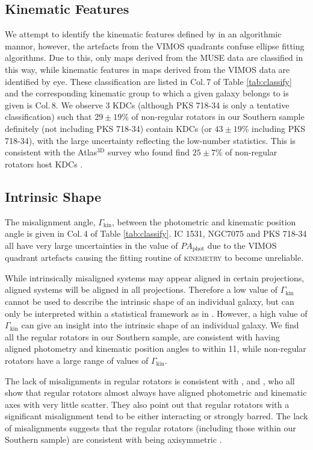 \documentclass[a4paper,fleqn,usenatbib]{mnras}
\begin{document}
	\subsection{Kinematic Features}
		We attempt to identify the kinematic features defined by \citet{Krajnovic2011} in an algorithmic mannor, however, the artefacts from the VIMOS quadrants confuse ellipse fitting algorithms. Due to this, only maps derived from the MUSE data are classified in this way, while kinematic features in maps derived from the VIMOS data are identified by eye. These classification are listed in Col.\,7 of Table \ref{tab:classify} and the corresponding kinematic group \citep[also defined by][]{Krajnovic2011} to which a given galaxy belongs to is given is Col.\,8. We observe 3 KDCs (although PKS 718-34 is only a tentative classification) such that $29\pm19$\% of non-regular rotators in our Southern sample definitely (not including PKS 718-34) contain KDCs (or $43\pm19$\% including PKS 718-34), with the large uncertainty reflecting the low-number statistics. This is consistent with the Atlas$^\text{3D}$ survey who found find $25\pm7$\% of non-regular rotators host KDCs \citep{Krajnovic2011}.


	\subsection{Intrinsic Shape}
		The misalignment angle, $\Gamma_\text{kin}$, between the photometric and kinematic position angle is given in Col.\,4 of Table \ref{tab:classify}. IC 1531, NGC7075 and PKS 718-34 all have very large uncertainties in the value of $PA_\text{phot}$ due to the VIMOS quadrant artefacts causing the fitting routine of \textsc{kinemetry} to become unreliable.

		While intrinsically misaligned systems may appear aligned in certain projections, aligned systems will be aligned in all projections. Therefore a low value of $\Gamma_\text{kin}$ cannot be used to describe the intrinsic shape of an individual galaxy, but can only be interpreted within a statistical framework as in \citet{Cappellari2007}. However, a high value of $\Gamma_\text{kin}$ can give an insight into the intrinsic shape of an individual galaxy. We find all the regular rotators in our Southern sample, are consistent with having aligned photometry and kinematic position angles to within 11\degr, while non-regular rotators have a large range of values of $\Gamma_\text{kin}$.  

		The lack of misalignments in regular rotators is consistent with \citet{Cappellari2007}, \citet{Krajnovic2011} and \citet{Fogarty2015}, who all show that regular rotators almost always have aligned photometric and kinematic axes with very little scatter. They also point out that regular rotators with a significant misalignment tend to be either interacting or strongly barred. The lack of misalignments suggests that the regular rotators (including those within our Southern sample) are consistent with being axisymmetric \citep{Cappellari2016}.
\end{document}
